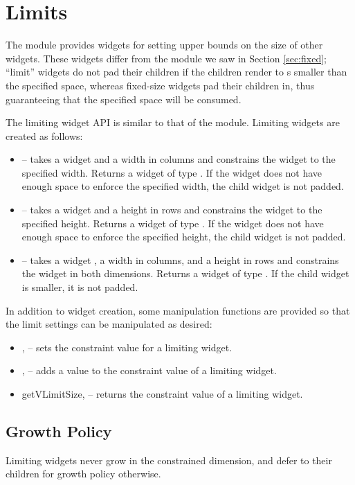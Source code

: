 \section{Limits}

The  module provides widgets for setting upper bounds on
the size of other widgets.  These widgets differ from the 
module we saw in Section \ref{sec:fixed}; ``limit'' widgets do not pad
their children if the children render to s smaller than the
specified space, whereas fixed-size widgets pad their children in,
thus guaranteeing that the specified space will be consumed.

The limiting widget API is similar to that of the  module.
Limiting widgets are created as follows:

\begin{itemize}
\item {} -- takes a widget  and a width in
  columns and constrains the widget to the specified width.  Returns a
  widget of type .  If the  widget
  does not have enough space to enforce the specified width, the child
  widget is not padded.
\item {} -- takes a widget  and a height in rows
  and constrains the widget to the specified height.  Returns a widget
  of type .  If the  widget does not
  have enough space to enforce the specified height, the child widget
  is not padded.
\item {} -- takes a widget , a width in
  columns, and a height in rows and constrains the widget in both
  dimensions.  Returns a widget of type .  If the child widget is smaller, it is not padded.
\end{itemize}

In addition to widget creation, some manipulation functions are
provided so that the limit settings can be manipulated as desired:

\begin{itemize}
\item {},  -- sets the constraint value for
  a limiting widget.
\item {},  -- adds a value to the
  constraint value of a limiting widget.
\item {getVLimitSize},  -- returns the constraint
  value of a limiting widget.
\end{itemize}

\subsection{Growth Policy}

Limiting widgets never grow in the constrained dimension, and defer to
their children for growth policy otherwise.
